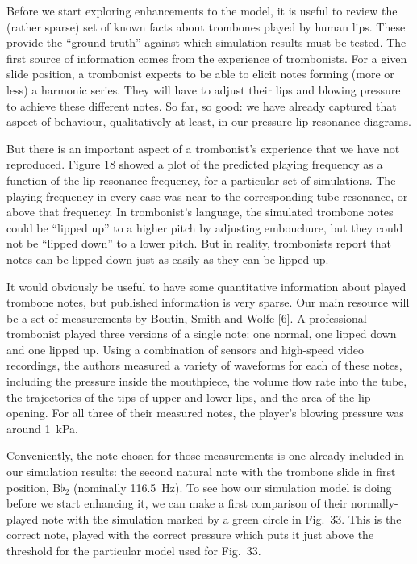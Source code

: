   Before we start exploring enhancements to the model, it is useful to review 
  the (rather sparse) set of known facts about trombones played by human lips. 
  These provide the “ground truth” against which simulation results must be 
  tested. The first source of information comes from the experience of 
  trombonists. For a given slide position, a trombonist expects to be able to 
  elicit notes forming (more or less) a harmonic series. They will have to 
  adjust their lips and blowing pressure to achieve these different notes. So 
  far, so good: we have already captured that aspect of behaviour, 
  qualitatively at least, in our pressure-lip resonance diagrams. 

  But there is an important aspect of a trombonist’s experience that we have 
  not reproduced. Figure 18 showed a plot of the predicted playing frequency as 
  a function of the lip resonance frequency, for a particular set of 
  simulations. The playing frequency in every case was near to the 
  corresponding tube resonance, or above that frequency. In trombonist’s 
  language, the simulated trombone notes could be “lipped up” to a higher pitch 
  by adjusting embouchure, but they could not be “lipped down” to a lower 
  pitch. But in reality, trombonists report that notes can be lipped down just 
  as easily as they can be lipped up. 

  It would obviously be useful to have some quantitative information about 
  played trombone notes, but published information is very sparse. Our main 
  resource will be a set of measurements by Boutin, Smith and Wolfe [6]. A 
  professional trombonist played three versions of a single note: one normal, 
  one lipped down and one lipped up. Using a combination of sensors and 
  high-speed video recordings, the authors measured a variety of waveforms for 
  each of these notes, including the pressure inside the mouthpiece, the volume 
  flow rate into the tube, the trajectories of the tips of upper and lower 
  lips, and the area of the lip opening. For all three of their measured notes, 
  the player’s blowing pressure was around 1~kPa. 

  Conveniently, the note chosen for those measurements is one already included 
  in our simulation results: the second natural note with the trombone slide in 
  first position, $\mathrm{B}\flat_2$ (nominally 116.5~Hz). To see how our 
  simulation model is doing before we start enhancing it, we can make a first 
  comparison of their normally-played note with the simulation marked by a 
  green circle in Fig.\ 33. This is the correct note, played with the correct 
  pressure which puts it just above the threshold for the particular model used 
  for Fig.\ 33. 

